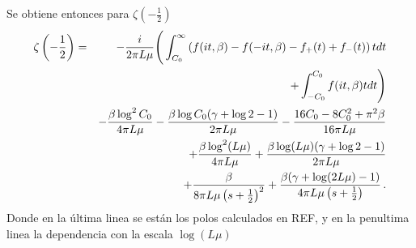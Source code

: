 Se obtiene entonces para $\zeta \left( - \frac{1}{2} \right)$
\begin{eqnarray}
\zeta \left( - \frac{1}{2} \right) &=& 
- \frac{i}{2 \pi L \mu} 
\Bigg(	  
		 \int _{C _0} ^{\infty}
			\left(
					f (i t,\beta )
					- f (-i t,\beta )
					- f _{+} (t) 
					+ f _{-} (t)
					\right)
			t   dt   \nonumber
\\ \nonumber
&&\hskip 1.5cm +
		 \int _{- C _0} ^{C _0}
			f (i t,\beta )
			t   dt 	
	\Bigg)
\\ \nonumber
&&
	- \frac{\beta \log ^2 C _0}{4 \pi L \mu}
	- \frac{\beta \log C _0 (\gamma + \log 2 -1 )}{2 \pi L \mu} 
	- \frac{16 C_0 - 8 C _0 ^2 + \pi ^2 \beta}{16 \pi L \mu}
\\ \nonumber
&&
	+\frac{\beta \log ^2 (L \mu )}{4 \pi L \mu} 
	+ \frac{\beta \log  (L \mu) (\gamma + \log 2 -1)}{2 \pi L \mu}
\\ 
&&	+ \frac{\beta}
		 {8 \pi L \mu  \left( s + \frac{1}{2} \right) ^2} +
	\frac{\beta (\gamma + \log (2 L \mu) -1 ) }
		 {4 \pi L \mu  \left( s + \frac{1}{2} 														 \right)} 
\, .
\end{eqnarray}
Donde en la última linea se están los polos calculados en REF, y en la penultima linea la dependencia con la escala $\log (L \mu)$














